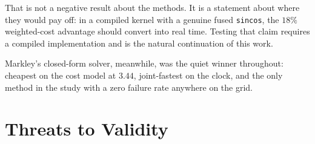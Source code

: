 \documentclass[11pt,a4paper]{article}
\begin{document}
That is not a negative result about the methods. It is a statement about
where they would pay off: in a compiled kernel with a genuine fused
\texttt{sincos}, the $18\%$ weighted-cost advantage should convert into
real time. Testing that claim requires a compiled implementation and is
the natural continuation of this work.

Markley's closed-form solver, meanwhile, was the quiet winner throughout:
cheapest on the cost model at $3.44$, joint-fastest on the clock, and the
only method in the study with a zero failure rate anywhere on the grid.

\section{Threats to Validity}
\end{document}
